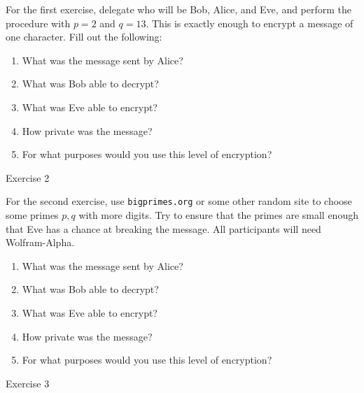 \documentclass{article}
\begin{document}
    For the first exercise, delegate who will be Bob, Alice, and Eve, and perform the procedure with $p=2$ and $q=13$. This is exactly enough to encrypt a message of one character. Fill out the following:
    \begin{enumerate}
        \item What was the message sent by Alice? 

            \TextField[width=6in,height=1in]{}

        \item What was Bob able to decrypt?

            \TextField[width=6in,height=1in]{}

        \item What was Eve able to encrypt?

            \TextField[width=6in,height=1in]{}

        \item How private was the message?

            \TextField[width=6in,height=1in]{}

        \item For what purposes would you use this level of encryption?

            \TextField[width=6in,height=1in]{}

    \end{enumerate}

\newpage

    \huge Exercise 2
    \normalsize

    For the second exercise, use \verb|bigprimes.org| or some other random site to choose some primes $p,q$ with more digits. Try to ensure that the primes are small enough that Eve has a chance at breaking the message. All participants will need Wolfram-Alpha.

    \begin{enumerate}
        \item What was the message sent by Alice? 

            \TextField[width=6in,height=1in]{}

        \item What was Bob able to decrypt?

            \TextField[width=6in,height=1in]{}

        \item What was Eve able to encrypt?

            \TextField[width=6in,height=1in]{}

        \item How private was the message?

            \TextField[width=6in,height=1in]{}

        \item For what purposes would you use this level of encryption?

            \TextField[width=6in,height=1in]{}

    \end{enumerate}
    \newpage
    \huge Exercise 3
    \normalsize
\end{document}
